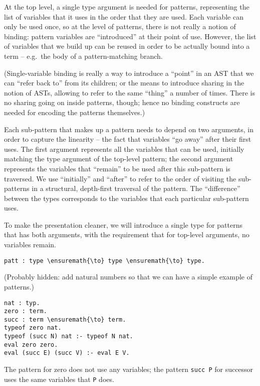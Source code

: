 At the top level, a single type argument is needed for patterns,
representing the list of variables that it uses in the order that they
are used. Each variable can only be used once, so at the level of
patterns, there is not really a notion of binding: pattern variables are
``introduced'' at their point of use. However, the list of variables
that we build up can be reused in order to be actually bound into a term
-- e.g.~the body of a pattern-matching branch.

(Single-variable binding is really a way to introduce a ``point'' in an
AST that we can ``refer back to'' from its children; or the means to
introduce sharing in the notion of ASTs, allowing to refer to the same
``thing'' a number of times. There is no sharing going on inside
patterns, though; hence no binding constructs are needed for encoding
the patterns themselves.)

Each sub-pattern that makes up a pattern needs to depend on two
arguments, in order to capture the linearity -- the fact that variables
``go away'' after their first uses. The first argument represents all
the variables that can be used, initially matching the type argument of
the top-level pattern; the second argument represents the variables that
``remain'' to be used after this sub-pattern is traversed. We use
``initially'' and ``after'' to refer to the order of visiting the
sub-patterns in a structural, depth-first traversal of the pattern. The
``difference'' between the types corresponds to the variables that each
particular sub-pattern uses.

To make the presentation cleaner, we will introduce a single type for
patterns that has both arguments, with the requirement that for
top-level arguments, no variables remain.

\begin{verbatim}
patt : type \ensuremath{\to} type \ensuremath{\to} type.
\end{verbatim}

(Probably hidden: add natural numbers so that we can have a simple
example of patterns.)

\begin{verbatim}
nat : typ.
zero : term.
succ : term \ensuremath{\to} term.
typeof zero nat.
typeof (succ N) nat :- typeof N nat.
eval zero zero.
eval (succ E) (succ V) :- eval E V.
\end{verbatim}

The pattern for zero does not use any variables; the pattern
\texttt{succ\ P} for successor uses the same variables that \texttt{P}
does.

